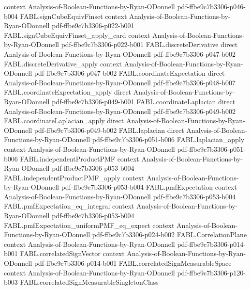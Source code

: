 \begin{theorem}
  {context}
  {Analysis-of-Boolean-Functions-by-Ryan-ODonnell}
  {pdf-ffbe9c7b3306-p046-b004}
\proofstep
  {FABL.signCubeEquivFinset}
  {context}
  {Analysis-of-Boolean-Functions-by-Ryan-ODonnell}
  {pdf-ffbe9c7b3306-p022-b001}
\proofstep
  {FABL.signCubeEquivFinset_apply_card}
  {context}
  {Analysis-of-Boolean-Functions-by-Ryan-ODonnell}
  {pdf-ffbe9c7b3306-p022-b001}
\proofstep
  {FABL.discreteDerivative}
  {direct}
  {Analysis-of-Boolean-Functions-by-Ryan-ODonnell}
  {pdf-ffbe9c7b3306-p047-b002}
\proofstep
  {FABL.discreteDerivative_apply}
  {context}
  {Analysis-of-Boolean-Functions-by-Ryan-ODonnell}
  {pdf-ffbe9c7b3306-p047-b002}
\proofstep
  {FABL.coordinateExpectation}
  {direct}
  {Analysis-of-Boolean-Functions-by-Ryan-ODonnell}
  {pdf-ffbe9c7b3306-p048-b007}
\proofstep
  {FABL.coordinateExpectation_apply}
  {direct}
  {Analysis-of-Boolean-Functions-by-Ryan-ODonnell}
  {pdf-ffbe9c7b3306-p049-b001}
\proofstep
  {FABL.coordinateLaplacian}
  {direct}
  {Analysis-of-Boolean-Functions-by-Ryan-ODonnell}
  {pdf-ffbe9c7b3306-p049-b002}
\proofstep
  {FABL.coordinateLaplacian_apply}
  {direct}
  {Analysis-of-Boolean-Functions-by-Ryan-ODonnell}
  {pdf-ffbe9c7b3306-p049-b002}
\proofstep
  {FABL.laplacian}
  {direct}
  {Analysis-of-Boolean-Functions-by-Ryan-ODonnell}
  {pdf-ffbe9c7b3306-p051-b006}
\proofstep
  {FABL.laplacian_apply}
  {context}
  {Analysis-of-Boolean-Functions-by-Ryan-ODonnell}
  {pdf-ffbe9c7b3306-p051-b006}
\proofstep
  {FABL.independentProductPMF}
  {context}
  {Analysis-of-Boolean-Functions-by-Ryan-ODonnell}
  {pdf-ffbe9c7b3306-p053-b004}
\proofstep
  {FABL.independentProductPMF_apply}
  {context}
  {Analysis-of-Boolean-Functions-by-Ryan-ODonnell}
  {pdf-ffbe9c7b3306-p053-b004}
\proofstep
  {FABL.pmfExpectation}
  {context}
  {Analysis-of-Boolean-Functions-by-Ryan-ODonnell}
  {pdf-ffbe9c7b3306-p053-b004}
\proofstep
  {FABL.pmfExpectation_eq_integral}
  {context}
  {Analysis-of-Boolean-Functions-by-Ryan-ODonnell}
  {pdf-ffbe9c7b3306-p053-b004}
\proofstep
  {FABL.pmfExpectation_uniformPMF_eq_expect}
  {context}
  {Analysis-of-Boolean-Functions-by-Ryan-ODonnell}
  {pdf-ffbe9c7b3306-p024-b002}
\proofstep
  {FABL.CorrelationPlane}
  {context}
  {Analysis-of-Boolean-Functions-by-Ryan-ODonnell}
  {pdf-ffbe9c7b3306-p014-b001}
\proofstep
  {FABL.correlatedSignVector}
  {context}
  {Analysis-of-Boolean-Functions-by-Ryan-ODonnell}
  {pdf-ffbe9c7b3306-p014-b001}
\proofstep
  {FABL.correlatedSignMeasurableSpace}
  {context}
  {Analysis-of-Boolean-Functions-by-Ryan-ODonnell}
  {pdf-ffbe9c7b3306-p120-b003}
\proofstep
  {FABL.correlatedSignMeasurableSingletonClass}

\end{theorem}
